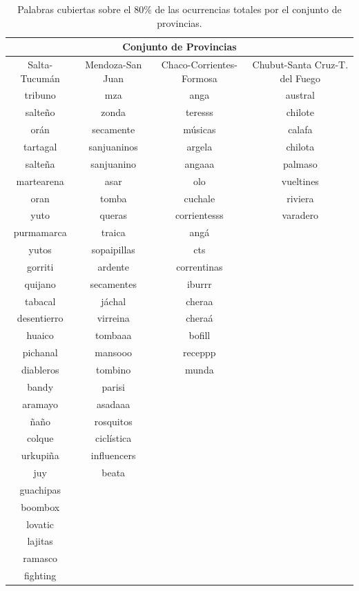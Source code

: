 \begin{table}[]
\centering
{%
\begin{tabular}{|c|c|c|c|}
\hline
\multicolumn{4}{|c|}{Conjunto de Provincias} \\ \hline
Salta-Tucumán & Mendoza-San Juan & Chaco-Corrientes-Formosa & Chubut-Santa Cruz-T. del Fuego \\
\hline
tribuno & mza & anga & austral \\
salteño & zonda & teresss & chilote \\
orán & secamente & músicas  & calafa\\
tartagal & sanjuaninos & argela & chilota\\
salteña & sanjuanino & angaaa & palmaso\\
martearena & asar & olo & vueltines\\
oran & tomba & cuchale & riviera\\
yuto & queras & corrientesss & varadero\\
purmamarca & traica & angá & \\
yutos & sopaipillas & cts & \\
gorriti & ardente & correntinas & \\
quijano & secamentes & iburrr & \\
tabacal & jáchal & cheraa & \\
desentierro & virreina & cheraá & \\
huaico & tombaaa & bofill & \\
pichanal & mansooo & receppp & \\
diableros & tombino & munda & \\
bandy & parisi &  &  \\
aramayo & asadaaa &  & \\
ñaño & rosquitos &  & \\
colque & ciclística &  & \\
urkupiña & influencers &  & \\
juy & beata &  & \\
guachipas &  &  & \\
boombox &  &  & \\
lovatic &  &  & \\
lajitas &  &  & \\
ramasco &  &  & \\
fighting &  & & \\ 
\hline
\end{tabular}%
}
\caption{Palabras cubiertas sobre el 80\% de las ocurrencias totales por el conjunto de provincias.}
\label{tab:palabrasRegiones}
\end{table}

